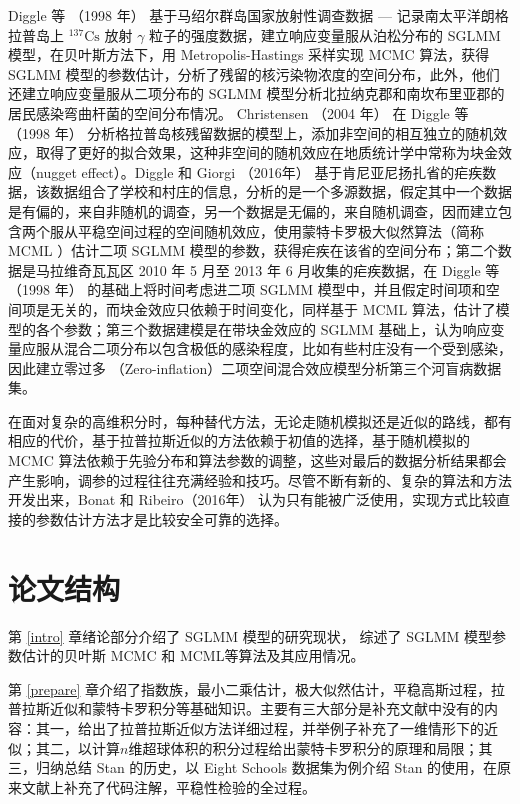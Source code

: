 \documentclass[12pt,a4paper,UTF8,twoside]{book}
\theoremstyle{definition}
\theoremstyle{definition}
\theoremstyle{definition}
\theoremstyle{remark}
\begin{document}
Diggle 等 （1998 年） \citep{Diggle1998}基于马绍尔群岛国家放射性调查数据
--- 记录南太平洋朗格拉普岛上 \({}^{137}\mathrm{Cs}\) 放射 \(\gamma\)
粒子的强度数据，建立响应变量服从泊松分布的 SGLMM
模型，在贝叶斯方法下，用 Metropolis-Hastings 采样实现 MCMC 算法，获得
SGLMM
模型的参数估计，分析了残留的核污染物浓度的空间分布，此外，他们还建立响应变量服从二项分布的
SGLMM 模型分析北拉纳克郡和南坎布里亚郡的居民感染弯曲杆菌的空间分布情况。
Christensen （2004 年） \citep{Christensen2004} 在 Diggle 等 （1998 年）
\citep{Diggle1998}
分析格拉普岛核残留数据的模型上，添加非空间的相互独立的随机效应，取得了更好的拟合效果，这种非空间的随机效应在地质统计学中常称为块金效应（nugget
effect）。Diggle 和 Giorgi （2016年） \citep{Diggle2016}
基于肯尼亚尼扬扎省的疟疾数据，该数据组合了学校和村庄的信息，分析的是一个多源数据，假定其中一个数据是有偏的，来自非随机的调查，另一个数据是无偏的，来自随机调查，因而建立包含两个服从平稳空间过程的空间随机效应，使用蒙特卡罗极大似然算法（简称
MCML ）估计二项 SGLMM
模型的参数，获得疟疾在该省的空间分布；第二个数据是马拉维奇瓦瓦区 2010 年
5 月至 2013 年 6 月收集的疟疾数据，在 Diggle 等 （1998 年）
\citep{Diggle1998}的基础上将时间考虑进二项 SGLMM
模型中，并且假定时间项和空间项是无关的，而块金效应只依赖于时间变化，同样基于
MCML 算法，估计了模型的各个参数；第三个数据建模是在带块金效应的 SGLMM
基础上，认为响应变量应服从混合二项分布以包含极低的感染程度，比如有些村庄没有一个受到感染，因此建立零过多
（Zero-inflation）二项空间混合效应模型分析第三个河盲病数据集。

在面对复杂的高维积分时，每种替代方法，无论走随机模拟还是近似的路线，都有相应的代价，基于拉普拉斯近似的方法依赖于初值的选择，基于随机模拟的
MCMC
算法依赖于先验分布和算法参数的调整，这些对最后的数据分析结果都会产生影响，调参的过程往往充满经验和技巧。尽管不断有新的、复杂的算法和方法开发出来，Bonat
和 Ribeiro（2016年） \citep{Bonat2016Practical}
认为只有能被广泛使用，实现方式比较直接的参数估计方法才是比较安全可靠的选择。

\hypertarget{stracture}{%
\section{论文结构}\label{stracture}}

第 \ref{intro} 章绪论部分介绍了 SGLMM 模型的研究现状， 综述了 SGLMM
模型参数估计的贝叶斯 MCMC 和 MCML等算法及其应用情况。

第 \ref{prepare}
章介绍了指数族，最小二乘估计，极大似然估计，平稳高斯过程，拉普拉斯近似和蒙特卡罗积分等基础知识。主要有三大部分是补充文献中没有的内容：其一，给出了拉普拉斯近似方法详细过程，并举例子补充了一维情形下的近似；其二，以计算\(n\)维超球体积的积分过程给出蒙特卡罗积分的原理和局限；其三，归纳总结
Stan 的历史，以 Eight Schools 数据集为例介绍 Stan
的使用，在原来文献上补充了代码注解，平稳性检验的全过程。
\end{document}
